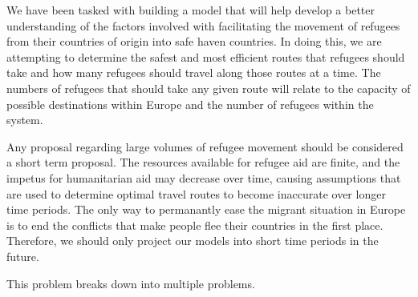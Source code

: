 \documentclass{article}
\begin{document}
We have been tasked with building a model that will help develop a better understanding of the factors involved with facilitating the movement of refugees from their countries of origin into safe haven countries. In doing this, we are attempting to determine the safest and most efficient routes that refugees should take and how many refugees should travel along those routes at a time. The numbers of refugees that should take any given route will relate to the capacity of possible destinations within Europe and the number of refugees within the system. 

Any proposal regarding large volumes of refugee movement should be considered a short term proposal. The resources available for refugee aid are finite, and the impetus for humanitarian aid may decrease over time, causing assumptions that are used to determine optimal travel routes to become inaccurate over longer time periods. The only way to permanantly ease the migrant situation in Europe is to end the conflicts that make people flee their countries in the first place. Therefore, we should only project our models into short time periods in the future.


This problem breaks down into multiple problems.
\end{document}

